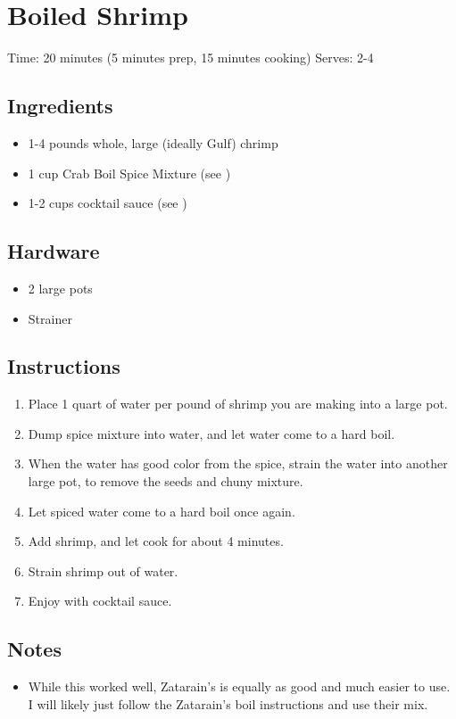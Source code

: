 \section{Boiled Shrimp}
\label{boiledShrimp}
\setcounter{secnumdepth}{0}
Time: 20 minutes (5 minutes prep, 15 minutes cooking)
Serves: 2-4

\begin{multicols}{2}
\subsection*{Ingredients}
\begin{itemize}
    \item 1-4 pounds whole, large (ideally Gulf) chrimp
    \item 1 cup Crab Boil Spice Mixture (see )
    \item 1-2 cups cocktail sauce (see )
\end{itemize}

\subsection*{Hardware}
\begin{itemize}
    \item 2 large pots
    \item Strainer
\end{itemize}
\clearpage

\subsection*{Instructions}
\begin{enumerate}
    \item Place 1 quart of water per pound of shrimp you are making into a large pot.
    \item Dump spice mixture into water, and let water come to a hard boil.
    \item When the water has good color from the spice, strain the water into another large pot, to remove the seeds and chuny mixture.
    \item Let spiced water come to a hard boil once again.
    \item Add shrimp, and let cook for about 4 minutes.
    \item Strain shrimp out of water.
    \item Enjoy with cocktail sauce.

\end{enumerate}

\subsection*{Notes}
\begin{itemize}
    \item While this worked well, Zatarain’s is equally as good and much easier to use. I will likely just follow the Zatarain’s boil instructions and use their mix.
\end{itemize}
\end{multicols}
\clearpage